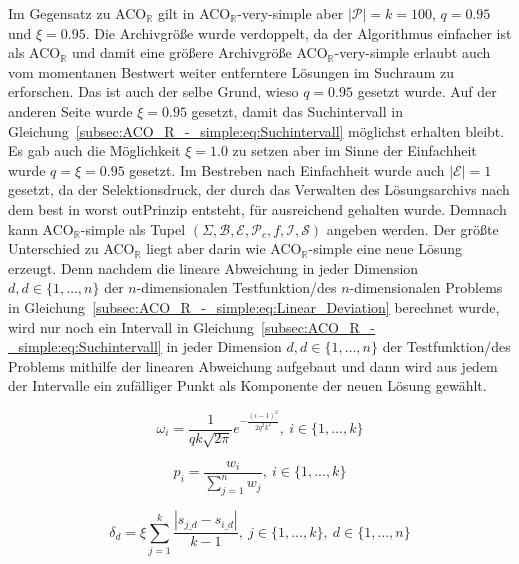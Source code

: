 \documentclass[fontsize=12, a4aper]{scrartcl}
\begin{document}
	Im Gegensatz zu ACO\(_\mathbb{R}\) gilt in ACO\(_{\mathbb{R}}\)-very-simple aber \(|\mathcal{P}| = k = 100\), \(q = 0.95\) und \(\xi = 0.95\). Die Archivgröße wurde verdoppelt, da der Algorithmus einfacher ist als ACO\(_\mathbb{R}\) und damit eine größere Archivgröße ACO\(_{\mathbb{R}}\)-very-simple erlaubt auch vom momentanen Bestwert weiter entferntere Lösungen im Suchraum zu erforschen. Das ist auch der selbe Grund, wieso \(q = 0.95\) gesetzt wurde. Auf der anderen Seite wurde \(\xi = 0.95\) gesetzt, damit das Suchintervall in Gleichung~\ref{subsec:ACO_R_-_simple:eq:Suchintervall} möglichst erhalten bleibt. Es gab auch die Möglichkeit \(\xi = 1.0\) zu setzen aber im Sinne der Einfachheit wurde \(q = \xi = 0.95\) gesetzt. Im Bestreben nach Einfachheit wurde auch \(|\mathcal{E}| = 1\) gesetzt, da der Selektionsdruck, der durch das Verwalten des Lösungsarchivs nach dem \glqq best in worst out\grqq Prinzip entsteht, für ausreichend gehalten wurde. Demnach kann ACO\(_{\mathbb{R}}\)-simple als Tupel \((\Sigma, \mathcal{B}, \mathcal{E}, \mathcal{P}_c, f, \mathcal{I}, \mathcal{S})\) angeben werden. Der größte Unterschied zu ACO\(_\mathbb{R}\) liegt aber darin wie ACO\(_{\mathbb{R}}\)-simple eine neue Lösung erzeugt. Denn nachdem die lineare Abweichung in jeder Dimension \(d, d \in \{1, \dots, n\}\) der \(n\)-dimensionalen Testfunktion/des \(n\)-dimensionalen Problems in Gleichung~\ref{subsec:ACO_R_-_simple:eq:Linear_Deviation} berechnet wurde, wird nur noch ein Intervall in Gleichung~\ref{subsec:ACO_R_-_simple:eq:Suchintervall} in jeder Dimension \(d, d \in \{1, \dots, n\}\) der Testfunktion/des Problems mithilfe der linearen Abweichung aufgebaut und dann wird aus jedem der Intervalle ein zufälliger Punkt als Komponente der neuen Lösung gewählt.
	
	\begin{equation} \label{subsec:ACO_R_-_simple:eq:omega}
		\omega_i = \frac{1}{qk\sqrt{2\pi}}e^{-\frac{(i-1)^2}{2q^2k^2}}, ~ 
		i \in \{1, ..., k\}
	\end{equation}
	
	\begin{equation} \label{subsec:ACO_R_-_simple:eq:Probability_Distribution}
		p_i=\frac{w_i}{\sum_{j=1}^{n} w_j}, ~  i \in \{1, ..., k\}
	\end{equation}
	
	\begin{equation} \label{subsec:ACO_R_-_simple:eq:Linear_Deviation}
		\delta_d = \xi\sum_{j=1}^{k} \frac{|s_{j\_d}-s_{i\_d}|}{k-1}, ~ j \in \{1, ..., k\}, ~ d \in \{1, ..., n\}
	\end{equation}
	
\end{document}
